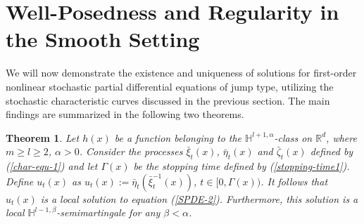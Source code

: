 \documentclass[12pt,oneside, reqno]{amsart}
\newtheorem{theorem}{Theorem}[section]
\def\mH{{\mathbb H}}
\def\mR{{\mathbb R}}
\def\geq{\geqslant}
\numberwithin{equation}{section}
\begin{document}
\section{Well-Posedness and Regularity in the Smooth Setting}
	We will now demonstrate the existence and uniqueness of solutions for first-order nonlinear stochastic partial differential equations of jump type, utilizing the stochastic characteristic curves discussed in the previous section. The main findings are summarized in the following two theorems.
   \begin{theorem}\label{existence-solution1}
   	Let $h(x)$ be a function belonging to the $\mH^{l+1,\alpha}$-class on $\mR^d$, where $m\geq l\geq2$, $\alpha>0$. Consider the processes $\bar{\xi}_t(x)$, $\bar{\eta}_t(x)$ and $\bar{\zeta}_t(x)$ defined by  (\ref{char-equ-1}) and let $\varGamma(x)$ be the stopping time defined by (\ref{stopping-time1}). Define $u_t(x)$ as  $u_t(x):=\bar{\eta}_t(\bar{\xi}_t^{-1}(x))$, $t\in [0,\varGamma(x))$. It follows that $u_t(x)$  is a local solution to equation (\ref{SPDE-2}). Furthermore, this solution is a local   $\mH^{l-1,\beta}$-semimartingale for any $\beta<\alpha$.
   \end{theorem}
\end{document}
